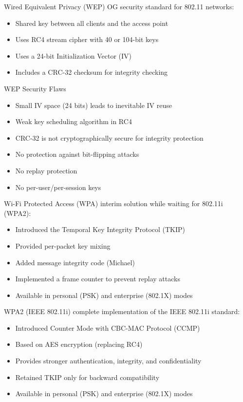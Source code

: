 \begin{definition}{Wired Equivalent Privacy (WEP)}
OG security standard for 802.11 networks:
\begin{itemize}
    \item Shared key between all clients and the access point
    \item Uses RC4 stream cipher with 40 or 104-bit keys
    \item Uses a 24-bit Initialization Vector (IV)
    \item Includes a CRC-32 checksum for integrity checking
\end{itemize}
\end{definition}

\begin{theorem}{WEP Security Flaws}
\begin{itemize}
    \item Small IV space (24 bits) leads to inevitable IV reuse
    \item Weak key scheduling algorithm in RC4
    \item CRC-32 is not cryptographically secure for integrity protection
    \item No protection against bit-flipping attacks
    \item No replay protection
    \item No per-user/per-session keys
\end{itemize}
\end{theorem}


\begin{definition}{Wi-Fi Protected Access (WPA)}
interim solution while waiting for 802.11i (WPA2):
\begin{itemize}
    \item Introduced the Temporal Key Integrity Protocol (TKIP)
    \item Provided per-packet key mixing
    \item Added message integrity code (Michael)
    \item Implemented a frame counter to prevent replay attacks
    \item Available in personal (PSK) and enterprise (802.1X) modes
\end{itemize}
\end{definition}

\begin{definition}{WPA2 (IEEE 802.11i)}
complete implementation of the IEEE 802.11i standard:
\begin{itemize}
    \item Introduced Counter Mode with CBC-MAC Protocol (CCMP)
    \item Based on AES encryption (replacing RC4)
    \item Provides stronger authentication, integrity, and confidentiality
    \item Retained TKIP only for backward compatibility
    \item Available in personal (PSK) and enterprise (802.1X) modes
\end{itemize}
\end{definition}



